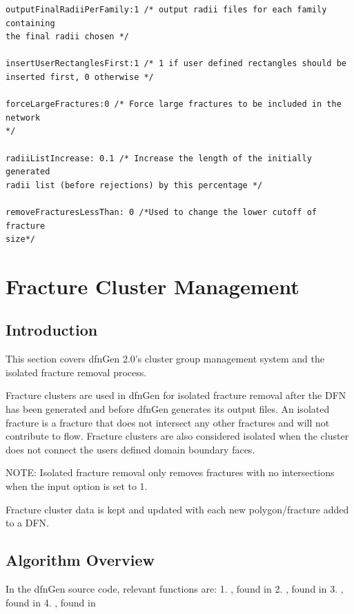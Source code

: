 \documentclass[letterpaper,10pt,english]{sphinxmanual}
\begin{document}
\begin{Verbatim}[commandchars=\\\{\}]
outputFinalRadiiPerFamily:1 /* output radii files for each family containing
the final radii chosen */

insertUserRectanglesFirst:1 /* 1 if user defined rectangles should be
inserted first, 0 otherwise */

forceLargeFractures:0 /* Force large fractures to be included in the network
*/

radiiListIncrease: 0.1 /* Increase the length of the initially generated
radii list (before rejections) by this percentage */

removeFracturesLessThan: 0 /*Used to change the lower cutoff of fracture
size*/
\end{Verbatim}


\section{Fracture Cluster Management}
\label{dfngen:fracture-cluster-management}

\subsection{Introduction}
\label{dfngen:introduction}
This section covers dfnGen 2.0’s cluster group management system
and the isolated fracture removal process.

Fracture clusters are used in dfnGen for isolated fracture removal after the DFN
has been generated and before dfnGen generates its output files. An isolated
fracture is a fracture that does not intersect any other fractures and will not
contribute to flow. Fracture clusters are also considered isolated when the
cluster does not connect the users defined domain boundary faces.

NOTE: Isolated fracture removal only removes fractures with no intersections
when the input option  is set to 1.

Fracture cluster data is kept and updated with each new polygon/fracture added
to a DFN.


\subsection{Algorithm Overview}
\label{dfngen:algorithm-overview}
In the dfnGen source code, relevant
functions are:
1. , found in 
2. , found in 
3. , found in 
4. , found in 
\end{document}
